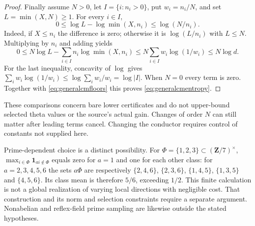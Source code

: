 \begin{proof}
Finally assume $N>0$, let $I=\{i:n_i>0\}$, put $w_i=n_i/N$,
and set $L=\min(X,N)\ge1$.
For every $i\in I$,
\[
 0\le\log L-\log\min(X,n_i)\le\log(N/n_i).
\]
Indeed, if $X\le n_i$ the difference is zero; otherwise it is
$\log(L/n_i)$ with $L\le N$.
Multiplying by $n_i$ and adding yields
\[
 0\le N\log L-\sum_{i\in I}n_i\log\min(X,n_i)
 \le N\sum_{i\in I}w_i\log(1/w_i)\le N\log d.
\]
For the last inequality, concavity of $\log$ gives
$\sum_iw_i\log(1/w_i)\le\log\sum_iw_i/w_i=\log|I|$.
When $N=0$ every term is zero.
Together with \eqref{eq:generalcmfloors} this proves
\eqref{eq:generalcmentropy}.
\end{proof}

These comparisons concern bare lower certificates and do not upper-bound
selected theta values or the source's actual gain. Changes of order $N$
can still matter after leading terms cancel. Changing the conductor
requires control of constants not supplied here.

Prime-dependent choice is a distinct possibility. For
$\Phi=\{1,2,3\}\subset(\mathbf Z/7)^\times$,
$\max_{i\in\Phi}\mathbf1_{ai\notin\Phi}$ equals zero for $a=1$
and one for each other class: for $a=2,3,4,5,6$ the sets $a\Phi$ are
respectively $\{2,4,6\}$, $\{2,3,6\}$, $\{1,4,5\}$,
$\{1,3,5\}$ and $\{4,5,6\}$.
Its class mean is therefore $5/6$, exceeding $1/2$.
This finite calculation is not a global realization of varying local
directions with negligible cost. That construction and its norm and
selection constraints require a separate argument. Nonabelian and
reflex-field prime sampling are likewise outside the stated hypotheses.
